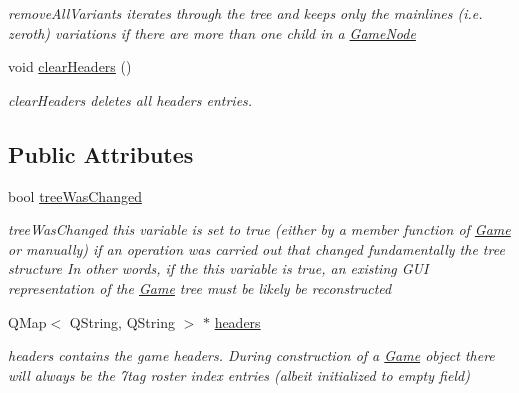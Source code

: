 \begin{DoxyCompactItemize}
\begin{DoxyCompactList}\small\item\em remove\-All\-Variants iterates through the tree and keeps only the mainlines (i.\-e. zeroth) variations if there are more than one child in a \hyperlink{classchess_1_1GameNode}{Game\-Node} \end{DoxyCompactList}\item 
\hypertarget{classchess_1_1Game_afa39fec09e0c6aa13b0c03e7ce1dbc44}{void \hyperlink{classchess_1_1Game_afa39fec09e0c6aa13b0c03e7ce1dbc44}{clear\-Headers} ()}\label{classchess_1_1Game_afa39fec09e0c6aa13b0c03e7ce1dbc44}

\begin{DoxyCompactList}\small\item\em clear\-Headers deletes all headers entries. \end{DoxyCompactList}\end{DoxyCompactItemize}
\subsection*{Public Attributes}
\begin{DoxyCompactItemize}
\item 
\hypertarget{classchess_1_1Game_a80169885e34540646a724431673067e5}{bool \hyperlink{classchess_1_1Game_a80169885e34540646a724431673067e5}{tree\-Was\-Changed}}\label{classchess_1_1Game_a80169885e34540646a724431673067e5}

\begin{DoxyCompactList}\small\item\em tree\-Was\-Changed this variable is set to true (either by a member function of \hyperlink{classchess_1_1Game}{Game} or manually) if an operation was carried out that changed fundamentally the tree structure In other words, if the this variable is true, an existing G\-U\-I representation of the \hyperlink{classchess_1_1Game}{Game} tree must be likely be reconstructed \end{DoxyCompactList}\item 
\hypertarget{classchess_1_1Game_a6c48e9e2ec4e304baf425dc9ab493b17}{Q\-Map$<$ Q\-String, Q\-String $>$ $\ast$ \hyperlink{classchess_1_1Game_a6c48e9e2ec4e304baf425dc9ab493b17}{headers}}\label{classchess_1_1Game_a6c48e9e2ec4e304baf425dc9ab493b17}

\begin{DoxyCompactList}\small\item\em headers contains the game headers. During construction of a \hyperlink{classchess_1_1Game}{Game} object there will always be the 7tag roster index entries (albeit initialized to empty field) \end{DoxyCompactList}\end{DoxyCompactItemize}


